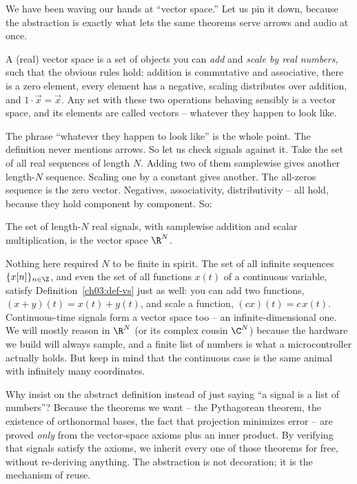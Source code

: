 We have been waving our hands at ``vector space.'' Let us pin it down, because the abstraction is
exactly what lets the same theorems serve arrows and audio at once.

\begin{definition}
\label{ch03:def-vs}
A (real) vector space is a set of objects you can \emph{add} and \emph{scale by real numbers}, such
that the obvious rules hold: addition is commutative and associative, there is a zero element, every
element has a negative, scaling distributes over addition, and $1\cdot\vec{x}=\vec{x}$. Any set with
these two operations behaving sensibly is a vector space, and its elements are called vectors --
whatever they happen to look like.
\end{definition}

The phrase ``whatever they happen to look like'' is the whole point. The definition never mentions
arrows. So let us check signals against it. Take the set of all real sequences of length $N$. Adding
two of them samplewise gives another length-$N$ sequence. Scaling one by a constant gives another.
The all-zeros sequence is the zero vector. Negatives, associativity, distributivity -- all hold,
because they hold component by component. So:

\begin{proposition}
\label{ch03:prop-RN}
The set of length-$N$ real signals, with samplewise addition and scalar multiplication, is the
vector space $\R^N$.
\end{proposition}

Nothing here required $N$ to be finite in spirit. The set of all infinite sequences
$\{x[n]\}_{n\in\Z}$, and even the set of all functions $x(t)$ of a continuous variable, satisfy
Definition~\ref{ch03:def-vs} just as well: you can add two functions, $(x+y)(t) = x(t)+y(t)$, and
scale a function, $(cx)(t)=c\,x(t)$. Continuous-time signals form a vector space too -- an
infinite-dimensional one. We will mostly reason in $\R^N$ (or its complex cousin $\C^N$) because the
hardware we build will always sample, and a finite list of numbers is what a microcontroller
actually holds. But keep in mind that the continuous case is the same animal with infinitely many
coordinates.

\begin{whybox}
Why insist on the abstract definition instead of just saying ``a signal is a list of numbers''?
Because the theorems we want -- the Pythagorean theorem, the existence of orthonormal bases, the
fact that projection minimizes error -- are proved \emph{only} from the vector-space axioms plus an
inner product. By verifying that signals satisfy the axioms, we inherit every one of those theorems
for free, without re-deriving anything. The abstraction is not decoration; it is the mechanism of
reuse.
\end{whybox}

